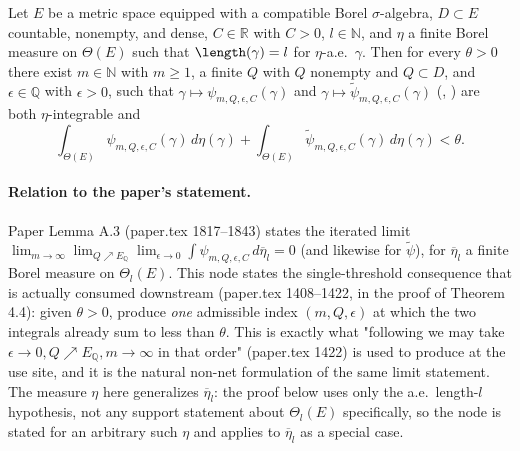\begin{lemma}
  Let $E$ be a metric space equipped with a compatible Borel $\sigma$-algebra, $D \subset E$
  countable, nonempty, and dense, $C \in \mathbb{R}$ with $C > 0$, $l \in \mathbb{N}$, and $\eta$ a
  finite Borel measure on $\Theta(E)$ such that $\length(\gamma) = l$ for $\eta$-a.e.\ $\gamma$.
  Then for every $\theta > 0$ there exist $m \in \mathbb{N}$ with $m \ge 1$, a finite $Q$ with
  $Q$ nonempty and $Q \subset D$, and $\epsilon \in \mathbb{Q}$ with $\epsilon > 0$, such that
  $\gamma \mapsto \psi_{m,Q,\epsilon,C}(\gamma)$ and $\gamma \mapsto \tilde\psi_{m,Q,\epsilon,C}(\gamma)$
  (, ) are both $\eta$-integrable and
  \[
    \int_{\Theta(E)} \psi_{m,Q,\epsilon,C}(\gamma) \, d\eta(\gamma)
    + \int_{\Theta(E)} \tilde\psi_{m,Q,\epsilon,C}(\gamma) \, d\eta(\gamma)
    < \theta
    .
  \]

  \paragraph{Relation to the paper's statement.} Paper Lemma A.3 (paper.tex 1817--1843) states the
  iterated limit $\lim_{m\to\infty}\lim_{Q\nearrow E_\mathbb{Q}}\lim_{\epsilon\to0} \int
  \psi_{m,Q,\epsilon,C}\,d\overline\eta_l = 0$ (and likewise for $\tilde\psi$), for $\overline\eta_l$
  a finite Borel measure on $\Theta_l(E)$. This node states the single-threshold consequence that
  is actually consumed downstream (paper.tex 1408--1422, in the proof of Theorem 4.4): given
  $\theta>0$, produce \emph{one} admissible index $(m,Q,\epsilon)$ at which the two integrals
  already sum to less than $\theta$. This is exactly what "following  we may
  take $\epsilon\to0,Q\nearrow E_\mathbb{Q},m\to\infty$ in that order" (paper.tex 1422) is used to
  produce at the use site, and it is the natural non-net formulation of the same limit statement.
  The measure $\eta$ here generalizes $\overline\eta_l$: the proof below uses only the a.e.\
  length-$l$ hypothesis, not any support statement about $\Theta_l(E)$ specifically, so the node
  is stated for an arbitrary such $\eta$ and applies to $\overline\eta_l$ as a special case.


\end{lemma}
